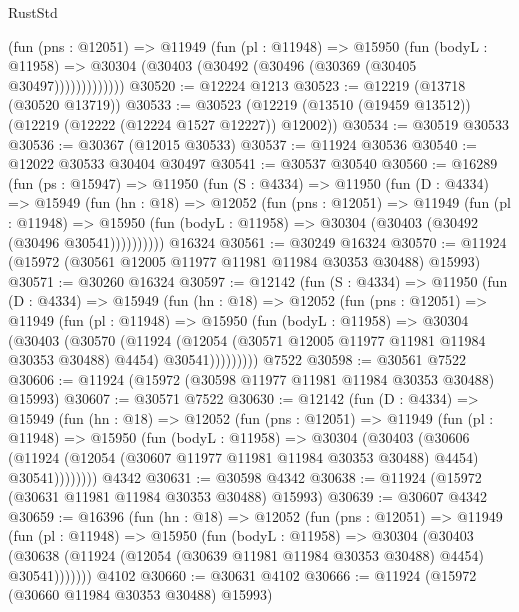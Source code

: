 \begin{lexlean}{RustStd}
\begin{coremodule}
{\begin{coremodule}
{{{{{{{{{{{{{{{{{{{{{{{{{{{{{{{{{{{{{{{{{{{{{{{{{{{{{{{{{{{{{{{{{{{{{{{{{{{{{{{{              (fun (pns : @12051) =>
              @11949
                (fun (pl : @11948) =>
                @15950
                  (fun (bodyL : @11958) =>
                  @30304 (@30403 (@30492 (@30496 (@30369 (@30405 @30497)))))))))))))
@30520 := @12224 @1213
@30523 := @12219 (@13718 (@30520 @13719))
@30533 := @30523 (@12219 (@13510 (@19459 @13512)) (@12219 (@12222 (@12224 @1527 @12227)) @12002))
@30534 := @30519 @30533
@30536 := @30367 (@12015 @30533)
@30537 := @11924 @30536
@30540 := @12022 @30533 @30404 @30497
@30541 := @30537 @30540
@30560 := @16289
    (fun (ps : @15947) =>
    @11950
      (fun (S : @4334) =>
      @11950
        (fun (D : @4334) =>
        @15949
          (fun (hn : @18) =>
          @12052
            (fun (pns : @12051) =>
            @11949
              (fun (pl : @11948) =>
              @15950 (fun (bodyL : @11958) => @30304 (@30403 (@30492 (@30496 @30541))))))))))
    @16324
@30561 := @30249 @16324
@30570 := @11924 (@15972 (@30561 @12005 @11977 @11981 @11984 @30353 @30488) @15993)
@30571 := @30260 @16324
@30597 := @12142
    (fun (S : @4334) =>
    @11950
      (fun (D : @4334) =>
      @15949
        (fun (hn : @18) =>
        @12052
          (fun (pns : @12051) =>
          @11949
            (fun (pl : @11948) =>
            @15950
              (fun (bodyL : @11958) =>
              @30304
                (@30403
                  (@30570
                    (@11924
                      (@12054 (@30571 @12005 @11977 @11981 @11984 @30353 @30488) @4454)
                      @30541)))))))))
    @7522
@30598 := @30561 @7522
@30606 := @11924 (@15972 (@30598 @11977 @11981 @11984 @30353 @30488) @15993)
@30607 := @30571 @7522
@30630 := @12142
    (fun (D : @4334) =>
    @15949
      (fun (hn : @18) =>
      @12052
        (fun (pns : @12051) =>
        @11949
          (fun (pl : @11948) =>
          @15950
            (fun (bodyL : @11958) =>
            @30304
              (@30403
                (@30606
                  (@11924 (@12054 (@30607 @11977 @11981 @11984 @30353 @30488) @4454) @30541))))))))
    @4342
@30631 := @30598 @4342
@30638 := @11924 (@15972 (@30631 @11981 @11984 @30353 @30488) @15993)
@30639 := @30607 @4342
@30659 := @16396
    (fun (hn : @18) =>
    @12052
      (fun (pns : @12051) =>
      @11949
        (fun (pl : @11948) =>
        @15950
          (fun (bodyL : @11958) =>
          @30304
            (@30403
              (@30638 (@11924 (@12054 (@30639 @11981 @11984 @30353 @30488) @4454) @30541)))))))
    @4102
@30660 := @30631 @4102
@30666 := @11924 (@15972 (@30660 @11984 @30353 @30488) @15993)
}}}}}}}}}}}}}}}}}}}}}}}}}}}}}}}}}}}}}}}}}}}}}}}}}}}}}}}}}}}}}}}}}}}}}}}}}}}}}}}}
\end{coremodule}}
\end{coremodule}
\end{lexlean}
